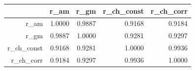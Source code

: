 \begin{table}[ht]
\centering
\begin{tabular}{rrrrr}
  \hline
 & r\_am & r\_gm & r\_ch\_const & r\_ch\_corr \\
  \hline
r\_am & 1.0000 & 0.9887 & 0.9168 & 0.9184 \\
  r\_gm & 0.9887 & 1.0000 & 0.9281 & 0.9297 \\
  r\_ch\_const & 0.9168 & 0.9281 & 1.0000 & 0.9936 \\
  r\_ch\_corr & 0.9184 & 0.9297 & 0.9936 & 1.0000 \\
   \hline
\end{tabular}
\end{table}
